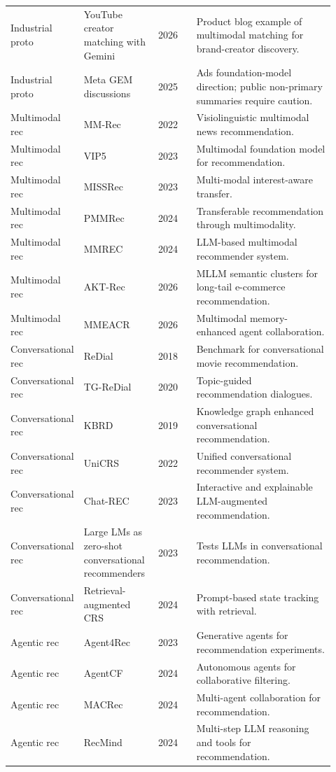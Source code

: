\documentclass[11pt]{article}
\begin{document}
\begin{longtable}{@{}p{0.13\linewidth}p{0.23\linewidth}p{0.12\linewidth}p{0.44\linewidth}@{}}
Industrial proto & YouTube creator matching with Gemini & 2026 & Product blog example of multimodal matching for brand-creator discovery.\\
Industrial proto & Meta GEM discussions & 2025 & Ads foundation-model direction; public non-primary summaries require caution.\\
Multimodal rec & MM-Rec & 2022 & Visiolinguistic multimodal news recommendation.\\
Multimodal rec & VIP5 & 2023 & Multimodal foundation model for recommendation.\\
Multimodal rec & MISSRec & 2023 & Multi-modal interest-aware transfer.\\
Multimodal rec & PMMRec & 2024 & Transferable recommendation through multimodality.\\
Multimodal rec & MMREC & 2024 & LLM-based multimodal recommender system.\\
Multimodal rec & AKT-Rec & 2026 & MLLM semantic clusters for long-tail e-commerce recommendation.\\
Multimodal rec & MMEACR & 2026 & Multimodal memory-enhanced agent collaboration.\\
Conversational rec & ReDial & 2018 & Benchmark for conversational movie recommendation.\\
Conversational rec & TG-ReDial & 2020 & Topic-guided recommendation dialogues.\\
Conversational rec & KBRD & 2019 & Knowledge graph enhanced conversational recommendation.\\
Conversational rec & UniCRS & 2022 & Unified conversational recommender system.\\
Conversational rec & Chat-REC & 2023 & Interactive and explainable LLM-augmented recommendation.\\
Conversational rec & Large LMs as zero-shot conversational recommenders & 2023 & Tests LLMs in conversational recommendation.\\
Conversational rec & Retrieval-augmented CRS & 2024 & Prompt-based state tracking with retrieval.\\
Agentic rec & Agent4Rec & 2023 & Generative agents for recommendation experiments.\\
Agentic rec & AgentCF & 2024 & Autonomous agents for collaborative filtering.\\
Agentic rec & MACRec & 2024 & Multi-agent collaboration for recommendation.\\
Agentic rec & RecMind & 2024 & Multi-step LLM reasoning and tools for recommendation.\\

\end{longtable}
\end{document}
